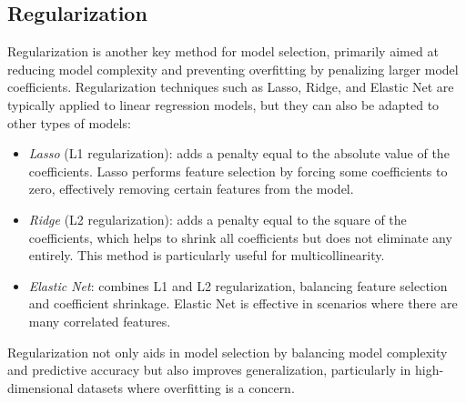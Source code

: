 \subsection{Regularization}
Regularization is another key method for model selection, primarily aimed at reducing model complexity and preventing overfitting by penalizing larger model coefficients. 
Regularization techniques such as Lasso, Ridge, and Elastic Net are typically applied to linear regression models, but they can also be adapted to other types of models: 
\begin{itemize} 
    \item \textit{Lasso} (L1 regularization): adds a penalty equal to the absolute value of the coefficients. 
        Lasso performs feature selection by forcing some coefficients to zero, effectively removing certain features from the model. 
    \item \textit{Ridge} (L2 regularization): adds a penalty equal to the square of the coefficients, which helps to shrink all coefficients but does not eliminate any entirely. 
        This method is particularly useful for multicollinearity. 
    \item \textit{Elastic Net}: combines L1 and L2 regularization, balancing feature selection and coefficient shrinkage. 
        Elastic Net is effective in scenarios where there are many correlated features. 
\end{itemize}
Regularization not only aids in model selection by balancing model complexity and predictive accuracy but also improves generalization, particularly in high-dimensional datasets where overfitting is a concern.